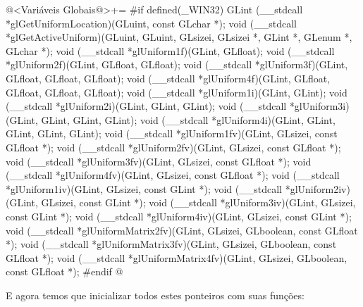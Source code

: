 \iniciocodigo
@<Variáveis Globais@>+=
#if defined(_WIN32)
GLint (__stdcall *glGetUniformLocation)(GLuint, const GLchar *);
void (__stdcall *glGetActiveUniform)(GLuint, GLuint, GLsizei, GLsizei *, GLint *,
                                     GLenum *, GLchar *);
void (__stdcall *glUniform1f)(GLint, GLfloat);
void (__stdcall *glUniform2f)(GLint, GLfloat, GLfloat);
void (__stdcall *glUniform3f)(GLint, GLfloat, GLfloat, GLfloat);
void (__stdcall *glUniform4f)(GLint, GLfloat, GLfloat, GLfloat, GLfloat);
void (__stdcall *glUniform1i)(GLint, GLint);
void (__stdcall *glUniform2i)(GLint, GLint, GLint);
void (__stdcall *glUniform3i)(GLint, GLint, GLint, GLint);
void (__stdcall *glUniform4i)(GLint, GLint, GLint, GLint, GLint);
void (__stdcall *glUniform1fv)(GLint, GLsizei, const GLfloat *);
void (__stdcall *glUniform2fv)(GLint, GLsizei, const GLfloat *);
void (__stdcall *glUniform3fv)(GLint, GLsizei, const GLfloat *);
void (__stdcall *glUniform4fv)(GLint, GLsizei, const GLfloat *);
void (__stdcall *glUniform1iv)(GLint, GLsizei, const GLint *);
void (__stdcall *glUniform2iv)(GLint, GLsizei, const GLint *);
void (__stdcall *glUniform3iv)(GLint, GLsizei, const GLint *);
void (__stdcall *glUniform4iv)(GLint, GLsizei, const GLint *);
void (__stdcall *glUniformMatrix2fv)(GLint, GLsizei, GLboolean, const GLfloat *);
void (__stdcall *glUniformMatrix3fv)(GLint, GLsizei, GLboolean, const GLfloat *);
void (__stdcall *glUniformMatrix4fv)(GLint, GLsizei, GLboolean, const GLfloat *);
#endif
@
\fimcodigo

E agora temos que inicializar todos estes ponteiros com suas funções:

